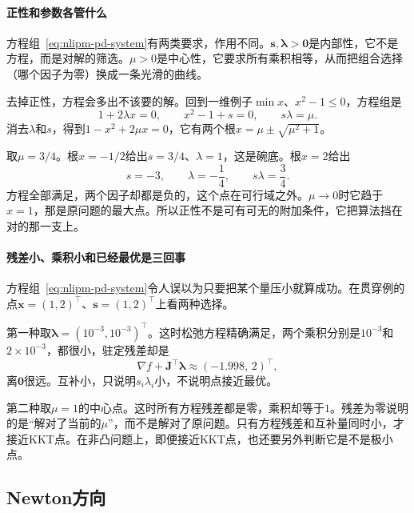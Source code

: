 \paragraph{正性和参数各管什么}
方程组~\eqref{eq:nlipm-pd-system}有两类要求，作用不同。$\bm{s},\bm{\lambda}>\bm{0}$是内部性，它不是方程，而是对解的筛选。$\mu>0$是中心性，它要求所有乘积相等，从而把组合选择（哪个因子为零）换成一条光滑的曲线。

去掉正性，方程会多出不该要的解。回到一维例子$\min x$、$x^2-1\leq0$，方程组是
\[
 1+2\lambda x=0,\qquad x^2-1+s=0,\qquad s\lambda=\mu.
\]
消去$\lambda$和$s$，得到$1-x^2+2\mu x=0$，它有两个根$x=\mu\pm\sqrt{\mu^2+1}$。

取$\mu=3/4$。根$x=-1/2$给出$s=3/4$、$\lambda=1$，这是碗底。根$x=2$给出
\[
 s=-3,\qquad\lambda=-\frac14,\qquad s\lambda=\frac34.
\]
方程全部满足，两个因子却都是负的，这个点在可行域之外。$\mu\to0$时它趋于$x=1$，那是原问题的最大点。所以正性不是可有可无的附加条件，它把算法挡在对的那一支上。

\paragraph{残差小、乘积小和已经最优是三回事}
方程组~\eqref{eq:nlipm-pd-system}令人误以为只要把某个量压小就算成功。在贯穿例的点$\bm{x}=(1,2)^\top$、$\bm{s}=(1,2)^\top$上看两种选择。

第一种取$\bm{\lambda}=(10^{-3},10^{-3})^\top$。这时松弛方程精确满足，两个乘积分别是$10^{-3}$和$2\times10^{-3}$，都很小，驻定残差却是
\[
 \nabla f+\bm{J}^\top\bm{\lambda}\approx(-1.998,\,2)^\top,
\]
离$\bm{0}$很远。互补小，只说明$s_i\lambda_i$小，不说明点接近最优。

第二种取$\mu=1$的中心点。这时所有方程残差都是零，乘积却等于$1$。残差为零说明的是“解对了当前的$\mu$”，而不是解对了原问题。只有方程残差和互补量同时小，才接近KKT点。在非凸问题上，即便接近KKT点，也还要另外判断它是不是极小点。

\subsection{Newton方向}
\label{sec:nlipm-newton}

